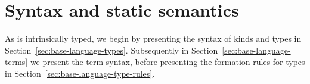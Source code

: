 \documentclass[12pt,phd,lfcs,twoside,openright,logo,leftchapter,normalheadings]{infthesis}
\theoremstyle{plain}
\theoremstyle{definition}
\begin{document}
\section{Syntax and static semantics}
\label{sec:syntax-base-language}

As \BCalc{} is intrinsically typed, we begin by presenting the syntax
of kinds and types in
Section~\ref{sec:base-language-types}. Subsequently in
Section~\ref{sec:base-language-terms} we present the term syntax,
before presenting the formation rules for types in
Section~\ref{sec:base-language-type-rules}.

\end{document}
